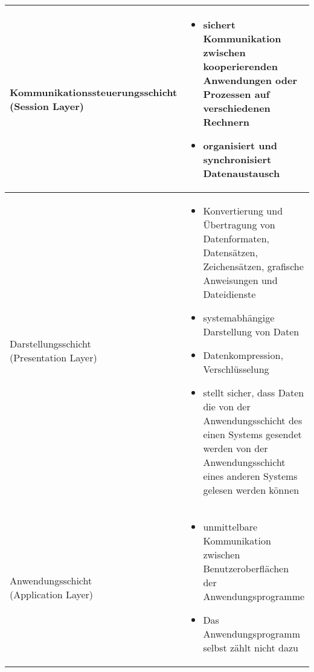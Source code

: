 \begin{longtable}{@{}p{}@{\hspace{3em}}p{}}
    \makecell[l]{Kommunikationssteuerungsschicht \\ (Session Layer)}
        &
        \begin{itemize}
            \item sichert Kommunikation zwischen kooperierenden Anwendungen oder Prozessen auf verschiedenen Rechnern
            \item organisiert und synchronisiert Datenaustausch
        \end{itemize}
    \\\hline

    \makecell[l]{Darstellungsschicht \\ (Presentation Layer)}
        &
        \begin{itemize}
            \item Konvertierung und Übertragung von Datenformaten, Datensätzen, Zeichensätzen, grafische Anweisungen und Dateidienste
            \item systemabhängige Darstellung von Daten
            \item Datenkompression, Verschlüsselung
            \item stellt sicher, dass Daten die von der Anwendungsschicht des einen Systems gesendet werden von der Anwendungsschicht eines anderen Systems gelesen werden können
        \end{itemize}
    \\\hline

    \makecell[l]{Anwendungsschicht \\ (Application Layer)}
        &
        \begin{itemize}
            \item unmittelbare Kommunikation zwischen Benutzeroberflächen der Anwendungsprogramme
            \item Das Anwendungsprogramm selbst zählt nicht dazu
        \end{itemize}
    \\\hline

    
\end{longtable}
